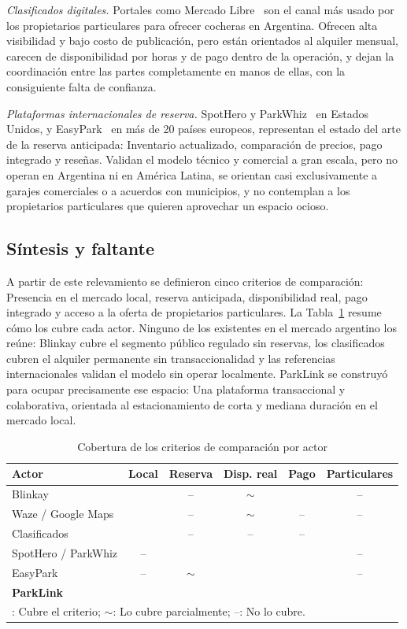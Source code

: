 \documentclass[conference,a4paper]{IEEEtran}
\newcommand{\si}{\checkmark}
\newcommand{\pa}{$\sim$}
\newcommand{\no}{--}
\begin{document}
\textit{Clasificados digitales.} Portales como Mercado Libre~\cite{mercadolibre} son el canal más usado por los propietarios particulares para ofrecer cocheras en Argentina. Ofrecen alta visibilidad y bajo costo de publicación, pero están orientados al alquiler mensual, carecen de disponibilidad por horas y de pago dentro de la operación, y dejan la coordinación entre las partes completamente en manos de ellas, con la consiguiente falta de confianza.

\textit{Plataformas internacionales de reserva.} SpotHero y ParkWhiz~\cite{spothero} en Estados Unidos, y EasyPark~\cite{easypark} en más de 20 países europeos, representan el estado del arte de la reserva anticipada: Inventario actualizado, comparación de precios, pago integrado y reseñas. Validan el modelo técnico y comercial a gran escala, pero no operan en Argentina ni en América Latina, se orientan casi exclusivamente a garajes comerciales o a acuerdos con municipios, y no contemplan a los propietarios particulares que quieren aprovechar un espacio ocioso.

\subsection{Síntesis y faltante}

A partir de este relevamiento se definieron cinco criterios de comparación: Presencia en el mercado local, reserva anticipada, disponibilidad real, pago integrado y acceso a la oferta de propietarios particulares. La Tabla~\ref{tab:comparativa} resume cómo los cubre cada actor. Ninguno de los existentes en el mercado argentino los reúne: Blinkay cubre el segmento público regulado sin reservas, los clasificados cubren el alquiler permanente sin transaccionalidad y las referencias internacionales validan el modelo sin operar localmente. ParkLink se construyó para ocupar precisamente ese espacio: Una plataforma transaccional y colaborativa, orientada al estacionamiento de corta y mediana duración en el mercado local.

\begin{table}[!t]
\centering
\caption{Cobertura de los criterios de comparación por actor}
\label{tab:comparativa}
\renewcommand{\arraystretch}{1.2}
\setlength{\tabcolsep}{4pt}
\begin{tabular}{l c c c c c}
\toprule
\textbf{Actor} & \textbf{Local} & \textbf{Reserva} & \textbf{Disp. real} & \textbf{Pago} & \textbf{Particulares} \\
\midrule
Blinkay & \si & \no & \pa & \si & \no \\
Waze / Google Maps & \si & \no & \pa & \no & \no \\
Clasificados & \si & \no & \no & \no & \si \\
SpotHero / ParkWhiz & \no & \si & \si & \si & \no \\
EasyPark & \no & \pa & \si & \si & \no \\
\midrule
\textbf{ParkLink} & \si & \si & \si & \si & \si \\
\bottomrule
\multicolumn{6}{l}{\footnotesize \si: Cubre el criterio; \pa: Lo cubre parcialmente; \no: No lo cubre.}
\end{tabular}
\end{table}
\end{document}
